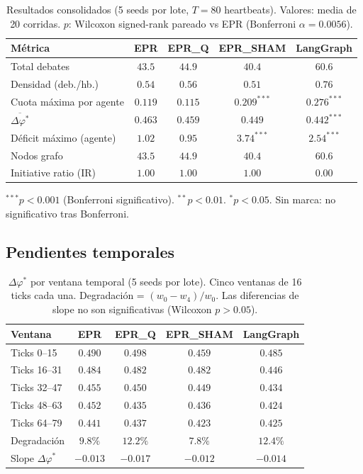 \documentclass{llncs}
\begin{document}
\begin{table}[H]
\caption{Resultados consolidados (5 seeds por lote, $T{=}80$ heartbeats).
Valores: media de 20 corridas. $p$: Wilcoxon signed-rank pareado vs EPR
(Bonferroni $\alpha{=}0.0056$).}
\label{tab:results}
\centering\small
\begin{tabular}{|l|c|c|c|c|}
\hline
\textbf{M\'etrica} & \textbf{EPR} & \textbf{EPR\_Q} & \textbf{EPR\_SHAM} & \textbf{LangGraph} \\
\hline
Total debates                       & $43.5$ & $44.9$ & $40.4$ & $60.6$ \\
Densidad (deb./hb.)                 & $0.54$ & $0.56$ & $0.51$ & $0.76$ \\
\hline
Cuota m\'axima por agente           & $0.119$ & $0.115$ & $0.209^{***}$ & $\mathbf{0.276^{***}}$ \\
$\overline{\Delta\varphi^*}$        & $0.463$ & $0.459$ & $0.449$ & $0.442^{***}$ \\
\hline
D\'eficit m\'aximo (agente)         & $1.02$ & $0.95$ & $\mathbf{3.74^{***}}$ & $2.54^{***}$ \\
Nodos grafo                         & $43.5$ & $44.9$ & $40.4$ & $60.6$ \\
Initiative ratio (IR)               & $1.00$ & $1.00$ & $1.00$ & $0.00$ \\
\hline
\end{tabular}
\end{table}

{\footnotesize $^{***}p<0.001$ (Bonferroni significativo). $^{**}p<0.01$.
$^{*}p<0.05$. Sin marca: no significativo tras Bonferroni.}

\subsection{Pendientes temporales}

\begin{table}[H]
\caption{$\Delta\varphi^*$ por ventana temporal (5 seeds por lote).
Cinco ventanas de 16 ticks cada una. Degradaci\'on = $(w_0 - w_4)/w_0$.
Las diferencias de slope no son significativas (Wilcoxon $p>0.05$).}
\label{tab:slopes}
\centering\small
\begin{tabular}{|l|c|c|c|c|}
\hline
\textbf{Ventana} & \textbf{EPR} & \textbf{EPR\_Q} & \textbf{EPR\_SHAM} & \textbf{LangGraph} \\
\hline
Ticks 0--15   & $0.490$ & $0.498$ & $0.459$ & $0.485$ \\
Ticks 16--31  & $0.484$ & $0.482$ & $0.482$ & $0.446$ \\
Ticks 32--47  & $0.455$ & $0.450$ & $0.449$ & $0.434$ \\
Ticks 48--63  & $0.452$ & $0.435$ & $0.436$ & $0.424$ \\
Ticks 64--79  & $0.441$ & $0.437$ & $0.423$ & $0.425$ \\
\hline
Degradaci\'on & $\mathbf{9.8\%}$ & $12.2\%$ & $7.8\%$ & $12.4\%$ \\
Slope $\Delta\varphi^*$ & $-0.013$ & $-0.017$ & $-0.012$ & $-0.014$ \\
\hline
\end{tabular}
\end{table}
\end{document}

